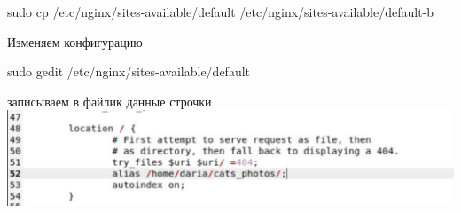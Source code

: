 \documentclass[12pt,a4paper]{scrartcl}
\begin{document}
\begin{center}
sudo cp /etc/nginx/sites-available/default /etc/nginx/sites-available/default-b
\end{center}
Изменяем конфигурацию \\
\begin{center}
sudo gedit /etc/nginx/sites-available/default
\end{center}
записываем в файлик данные строчки 
\\[5pt]
\includegraphics[scale=10, width=15cm]{f2}
\\[5pt]
\end{document}
